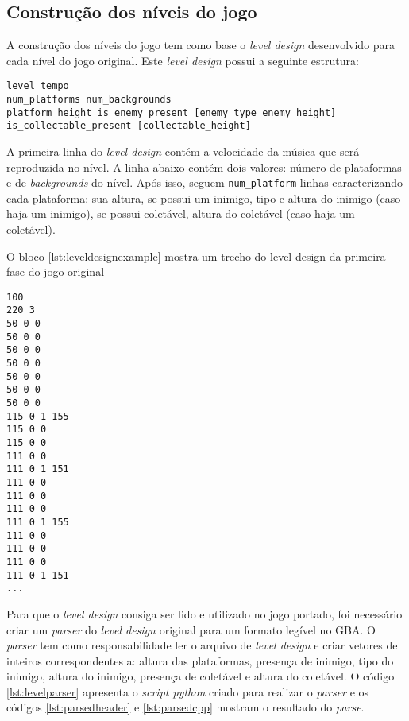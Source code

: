 \subsection{Construção dos níveis do jogo}

A construção dos níveis do jogo tem como base o \textit{level design} desenvolvido para cada nível do jogo original. Este \textit{level design} possui a seguinte estrutura:

\begin{lstlisting}[caption={Estrutura do \textit{level design} do jogo original}]
level_tempo
num_platforms num_backgrounds
platform_height is_enemy_present [enemy_type enemy_height] is_collectable_present [collectable_height]
\end{lstlisting}

A primeira linha do \textit{level design} contém a velocidade da música que será reproduzida no nível. A linha abaixo contém dois valores: número de plataformas e de \textit{backgrounds} do nível. Após isso, seguem \texttt{num\_platform} linhas caracterizando cada plataforma: sua altura, se possui um inimigo, tipo e altura do inimigo (caso haja um inimigo), se possui coletável, altura do coletável (caso haja um coletável).

O bloco \ref{lst:leveldesignexample} mostra um trecho do level design da primeira fase do jogo original

\begin{lstlisting}[label={lst:leveldesignexample},caption={Exemplo do \textit{level design} da fase 1 do jogo original}]
100
220 3
50 0 0
50 0 0
50 0 0
50 0 0
50 0 0
50 0 0
50 0 0
115 0 1 155
115 0 0
115 0 0
111 0 0
111 0 1 151
111 0 0
111 0 0
111 0 0
111 0 1 155
111 0 0
111 0 0
111 0 0
111 0 1 151
...
\end{lstlisting}

Para que o \textit{level design} consiga ser lido e utilizado no jogo portado, foi necessário criar um \textit{parser} do \textit{level design} original para um formato legível no GBA. O \textit{parser} tem como responsabilidade ler o arquivo de \textit{level design} e criar vetores de inteiros correspondentes a: altura das plataformas, presença de inimigo, tipo do inimigo, altura do inimigo, presença de coletável e altura do coletável. O código \ref{lst:levelparser} apresenta o \textit{script python} criado para realizar o \textit{parser} e os códigos \ref{lst:parsedheader} e \ref{lst:parsedcpp} mostram o resultado do \textit{parse}.

